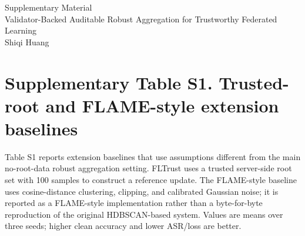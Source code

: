\documentclass[12pt]{article}
\begin{document}
\begin{center}
{\Large Supplementary Material}\\[0.5em]
{\large Validator-Backed Auditable Robust Aggregation for Trustworthy Federated Learning}\\[0.5em]
Shiqi Huang
\end{center}

\section*{Supplementary Table S1. Trusted-root and FLAME-style extension baselines}

Table S1 reports extension baselines that use assumptions different from the main no-root-data robust aggregation setting. FLTrust uses a trusted server-side root set with 100 samples to construct a reference update. The FLAME-style baseline uses cosine-distance clustering, clipping, and calibrated Gaussian noise; it is reported as a FLAME-style implementation rather than a byte-for-byte reproduction of the original HDBSCAN-based system. Values are means over three seeds; higher clean accuracy and lower ASR/loss are better.

\begin{table}[h]
\centering
\caption*{S1a. FLTrust extension on Fashion-MNIST under main poisoning attacks.}
\end{table}
\end{document}
